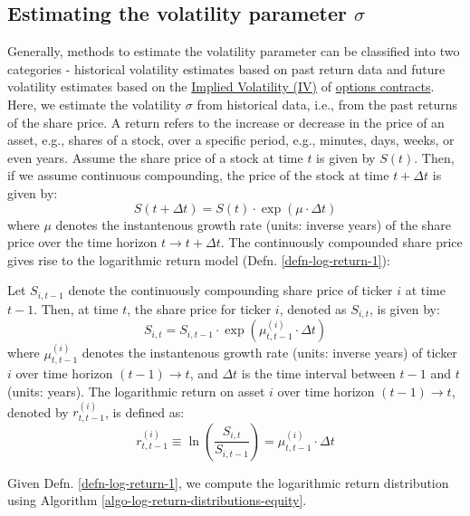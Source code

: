 \documentclass[11pt]{article}
\theoremstyle{definition}
\begin{document}
\subsection{Estimating the volatility parameter $\sigma$}
Generally, methods to estimate the volatility parameter can be classified into two categories - historical volatility estimates based on past return data and future volatility 
estimates based on the \href{https://en.wikipedia.org/wiki/Implied_volatility}{Implied Volatility (IV)} of \href{https://en.wikipedia.org/wiki/Option_(finance)}{options contracts}. 
Here, we estimate the volatility $\sigma$ from historical data, i.e., from the past returns of the share price.
A return refers to the increase or decrease in the price of an asset, e.g., shares of a stock, over a specific period, e.g., minutes, days, weeks, or even years. 
Assume the share price of a stock at time $t$ is given by $S(t)$. Then, if we assume continuous compounding, the price of the stock at time $t+\Delta{t}$ is given by:
\begin{equation}
    S(t+\Delta{t}) = S(t)\cdot\exp\left(\mu\cdot{\Delta{t}}\right)
\end{equation}
where $\mu$ denotes the instantenous growth rate (units: inverse years) of the share price over the time horizon $t\rightarrow{t+\Delta{t}}$. 
The continuously compounded share price gives rise to the logarithmic return model (Defn. \ref{defn-log-return-1}):
\begin{definition}\label{defn-log-return-1}
Let $S_{i,t-1}$ denote the continuously compounding share price of ticker $i$ at time $t-1$. Then, at time $t$, the share price for ticker $i$, denoted as $S_{i,t}$,
is given by:
\begin{equation}
    S_{i,t} = S_{i,t-1}\cdot\exp\left(\mu^{(i)}_{t,t-1}\cdot{\Delta{t}}\right)
\end{equation}
where $\mu^{(i)}_{t,t-1}$ denotes the instantenous growth rate (units: inverse years) of ticker $i$ over time horizon $(t-1)\rightarrow{t}$, 
and $\Delta{t}$ is the time interval between $t-1$ and $t$ (units: years). The logarithmic return on asset $i$ over time horizon $(t-1)\rightarrow{t}$, 
denoted by $r^{(i)}_{t,t-1}$, is defined as:
\begin{equation}
r^{(i)}_{t,t-1} \equiv \ln\left(\frac{S_{i,t}}{S_{i,t-1}}\right) = \mu^{(i)}_{t,t-1}\cdot{\Delta{t}}
\end{equation} 
\end{definition}
Given Defn. \ref{defn-log-return-1}, we compute the logarithmic return distribution using Algorithm \ref{algo-log-return-distributions-equity}.
\end{document}
